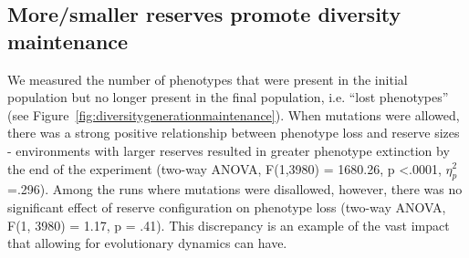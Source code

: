 \documentclass[letterpaper]{article}
\begin{document}
\subsection{More/smaller reserves promote diversity maintenance}

	We measured the number of phenotypes that were present in the initial population but no longer present in the final population, i.e. “lost phenotypes” (see Figure~\ref{fig:diversitygenerationmaintenance}).  When mutations were allowed, there was a strong positive relationship between phenotype loss and reserve sizes - environments with larger reserves resulted in greater phenotype extinction by the end of the experiment (two-way ANOVA, F(1,3980) = 1680.26, p \textless .0001, $\eta_{p}^{2}$=.296).  Among the runs where mutations were disallowed, however, there was no significant effect of reserve configuration on phenotype loss (two-way ANOVA, F(1, 3980) = 1.17, p = .41). This discrepancy is an example of the vast impact that allowing for evolutionary dynamics can have. 
\end{document}
